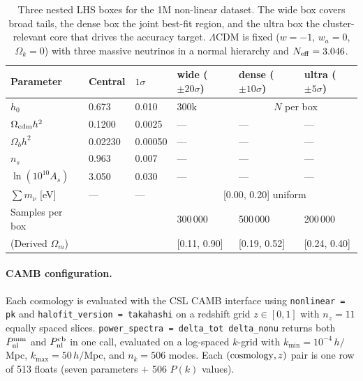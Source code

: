 \documentclass[11pt]{article}
\begin{document}
\begin{table}[h]
  \centering
  \begin{tabular}{l l l l l l}
    \toprule
    Parameter & Central & $1\sigma$ & wide ($\pm20\sigma$) & dense ($\pm10\sigma$) & ultra ($\pm5\sigma$) \\
    \midrule
    $h_0$                   & 0.673   & 0.010  & 300k & \multicolumn{2}{c}{$N$ per box} \\
    $\Omega_{\rm cdm} h^2$  & 0.1200  & 0.0025 & ---  & ---                 & --- \\
    $\Omega_b h^2$          & 0.02230 & 0.00050& ---  & ---                 & --- \\
    $n_s$                   & 0.963   & 0.007  & ---  & ---                 & --- \\
    $\ln(10^{10} A_s)$      & 3.050   & 0.030  & ---  & ---                 & --- \\
    $\sum m_\nu$ [eV]       & ---     & ---    & \multicolumn{3}{c}{[0.00, 0.20] uniform} \\
    \midrule
    Samples per box         & & & 300\,000 & 500\,000 & 200\,000 \\
    (Derived $\Omega_m$)    & & & [0.11, 0.90] & [0.19, 0.52] & [0.24, 0.40] \\
    \bottomrule
  \end{tabular}
  \caption{Three nested LHS boxes for the 1M non-linear dataset. The wide
  box covers broad tails, the dense box the joint best-fit region, and the
  ultra box the cluster-relevant core that drives the accuracy target.
  $\Lambda$CDM is fixed ($w=-1$, $w_a=0$, $\Omega_k=0$) with three massive
  neutrinos in a normal hierarchy and $N_{\rm eff}=3.046$.}
  \label{tab:priors}
\end{table}

\paragraph{CAMB configuration.} Each cosmology is evaluated with the CSL
CAMB interface using \texttt{nonlinear = pk} and
\texttt{halofit\_version = takahashi} on a redshift grid
$z \in [0, 1]$ with $n_z = 11$ equally spaced slices.
\texttt{power\_spectra = delta\_tot\ delta\_nonu} returns both
$P^{\rm mm}_{\rm nl}$ and $P^{\rm cb}_{\rm nl}$ in one call, evaluated
on a log-spaced $k$-grid with $k_{\min} = 10^{-4}\,h/$Mpc,
$k_{\max} = 50\,h/$Mpc, and $n_k = 506$ modes. Each $({\rm cosmology},
z)$ pair is one row of 513 floats (seven parameters $+$ 506 $P(k)$
values).
\end{document}
